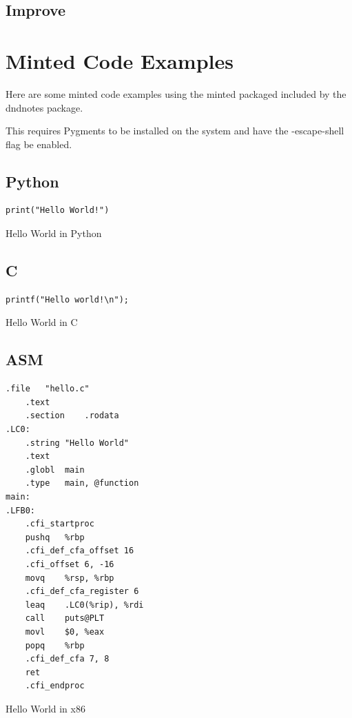 \documentclass[letterpaper,10pt,twoside,twocolumn,openany]{book}
\begin{document}
\section{Improve}
\lipsum[4][1-5]
\lipsum[4][6-10]

\chapter{Minted Code Examples}
Here are some minted code examples using the minted packaged included by the dndnotes package.
\begin{Note}
  This requires Pygments to be installed on the system and have the -escape-shell flag be enabled.
\end{Note}
\section{Python}
\begin{listing}[h]
\begin{verbatim}
print("Hello World!")
\end{verbatim}
\caption{Hello World in Python}
\label{lst:hello_world_in_python}
\end{listing}

\section{C}
\begin{listing}[h]
\begin{verbatim}
printf("Hello world!\n");
\end{verbatim}
\caption{Hello World in C}
\label{lst:hello_world_in_c}
\end{listing}

\section{ASM}
\begin{listing}[h]
\begin{verbatim}
.file	"hello.c"
	.text
	.section	.rodata
.LC0:
	.string	"Hello World"
	.text
	.globl	main
	.type	main, @function
main:
.LFB0:
	.cfi_startproc
	pushq	%rbp
	.cfi_def_cfa_offset 16
	.cfi_offset 6, -16
	movq	%rsp, %rbp
	.cfi_def_cfa_register 6
	leaq	.LC0(%rip), %rdi
	call	puts@PLT
	movl	$0, %eax
	popq	%rbp
	.cfi_def_cfa 7, 8
	ret
	.cfi_endproc
\end{verbatim}
\caption{Hello World in x86}
\label{lst:hello_world_in_x86}
\end{listing}
\end{document}
